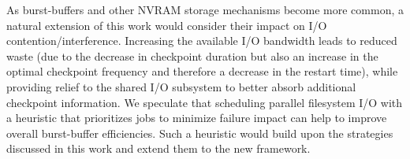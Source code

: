 \documentclass[two]{article}
\newcommand{\ie}[0]{\emph{i.e.}\xspace}
\begin{document}

As burst-buffers and other NVRAM storage mechanisms become more common, a natural
extension of this work would consider their impact on I/O contention/interference.
Increasing the available I/O
bandwidth leads to reduced waste (due to the decrease in checkpoint duration but also
an increase in the optimal checkpoint frequency and therefore a decrease in the
restart time), while providing relief to the shared I/O subsystem to better absorb
additional checkpoint information. We speculate that scheduling parallel filesystem
I/O with a heuristic that prioritizes jobs to minimize failure impact can help to
improve overall burst-buffer efficiencies. Such a heuristic would build upon the
strategies discussed in this work and extend them to the new framework.
\end{document}
